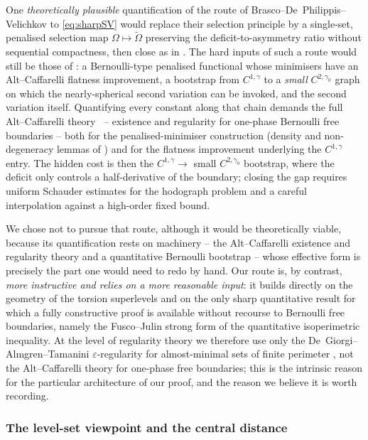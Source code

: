 \documentclass[11pt]{amsart}
\theoremstyle{definition}
\newcommand{\Om}{\Omega}
\newcommand{\eps}{\varepsilon}
\begin{document}
One \emph{theoretically plausible} quantification of the route of
Brasco--De~Philippis--Velichkov to \eqref{eq:sharpSV} would replace their
selection principle by a single-set, penalised selection map
\(\Om\mapsto\widetilde\Om\) preserving the deficit-to-asymmetry ratio
without sequential compactness, then close as in \cite{BDV}.  The hard
inputs of such a route would still be those of \cite{BDV}: a
Bernoulli-type penalised functional whose minimisers have an
Alt--Caffarelli flatness improvement, a bootstrap from \(C^{1,\gamma}\)
to a \emph{small} \(C^{2,\gamma_0}\) graph on which the nearly-spherical
second variation can be invoked, and the second variation itself.
Quantifying every constant along that chain demands the full
Alt--Caffarelli theory~\cite{AltCaffarelli1981} -- existence and regularity
for one-phase Bernoulli free boundaries -- both for the
penalised-minimiser construction (density and non-degeneracy lemmas of
\cite{BDV}) and for the flatness improvement underlying the
\(C^{1,\gamma}\) entry.  The hidden cost is then the
\(C^{1,\gamma}\to\) small \(C^{2,\gamma_0}\) bootstrap, where the
deficit only controls a half-derivative of the boundary; closing the
gap requires uniform Schauder estimates for the hodograph problem and a
careful interpolation against a high-order fixed bound.

We chose not to pursue that route, although it would be theoretically
viable, because its quantification rests on machinery -- the
Alt--Caffarelli existence and regularity theory and a quantitative
Bernoulli bootstrap -- whose effective form is precisely the part one
would need to redo by hand.  Our route is, by contrast, \emph{more
instructive and relies on a more reasonable input}: it builds directly
on the geometry of the torsion superlevels and on the only sharp
quantitative result for which a fully constructive proof is available
without recourse to Bernoulli free boundaries, namely the Fusco--Julin
strong form of the quantitative isoperimetric inequality.  At the level
of regularity theory we therefore use only the De~Giorgi--Almgren--Tamanini
\(\eps\)-regularity for almost-minimal sets of finite perimeter
\cite{Almgren1976,Tamanini1984,Maggi2012}, not the Alt--Caffarelli theory
for one-phase free boundaries; this is the intrinsic reason for the
particular architecture of our proof, and the reason we believe it is
worth recording.

\subsubsection*{The level-set viewpoint and the central distance}
\end{document}
